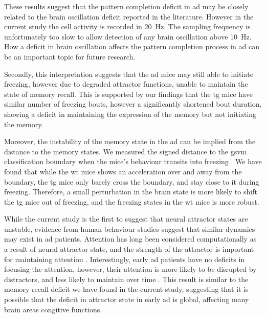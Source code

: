 These results suggest that the pattern completion deficit in \gls{ad} may be closely related to the brain oscillation deficit reported in the literature. However in the current study the cell activity is recorded in \SI{20}{\hertz}. The sampling frequency is unfortunately too slow to allow detection of any brain oscillation above \SI{10}{\hertz}. How a deficit in brain oscillation affects the pattern completion process in \gls{ad} can be an important topic for future research. 

Secondly, this interpretation suggests that the \gls{ad} mice may still able to initiate freezing, however due to degraded attractor functions, unable to maintain the state of memory recall. This is supported by our findings that the \gls{tg} mice have similar number of freezing bouts, however a significantly shortened bout duration, showing a deficit in maintaining the expression of the memory but not initiating the memory. 

Moreover, the instability of the memory state in the \gls{ad} can be implied from the distance to the memory states. We measured the signed distance to the \gls{gsvm} classification boundary when the mice's behaviour transits into freezing . We have found that while the \gls{wt} mice shows an acceleration over and away from the boundary, the \gls{tg} mice only barely cross the boundary, and stay close to it during freezing. Therefore, a small perturbation in the brain state is more likely to shift the \gls{tg} mice out of freezing, and the freezing states in the \gls{wt} mice is more robust.  

While the current study is the first to suggest that neural attractor states are unstable, evidence from human behaviour studies suggest that similar dynamics may exist in \gls{ad} patients. Attention has long been considered computationally as a result of neural attractor state, and the strength of the attractor is important for maintaining attention \citep{desimone95, rolls08a, rolls13a}. Interestingly, early \gls{ad} patients have no deficits in focusing the attention, however, their attention is more likely to be disrupted by distractors, and less likely to maintain over time \citep{perry99}. This result is similar to the memory recall deficit we have found in the current study, suggesting that it is possible that the deficit in attractor state in early \gls{ad} is global, affecting many brain areas congitive functions. 

